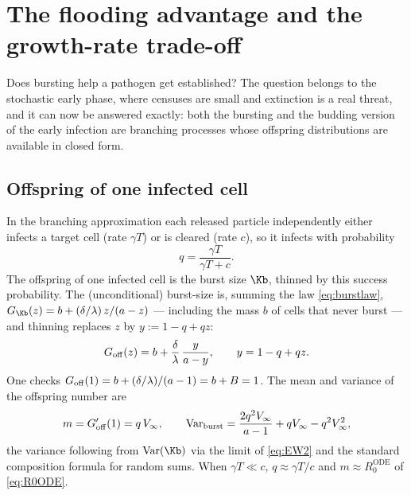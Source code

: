 
\section{The flooding advantage and the growth-rate trade-off}
\label{sec:flooding}

Does bursting help a pathogen get established? The question belongs to the
stochastic early phase, where censuses are small and extinction is a real
threat, and it can now be answered exactly: both the bursting and the
budding version of the early infection are branching processes whose
offspring distributions are available in closed form.

\subsection{Offspring of one infected cell}

In the branching approximation each released particle independently either
infects a target cell (rate $\gamma T$) or is cleared (rate $c$), so it
infects with probability
\begin{equation}
q=\frac{\gamma T}{\gamma T+c}.
\end{equation}
The offspring of one infected cell is the burst size $\Kb$, thinned by this
success probability. The (unconditional) burst-size \pgf{} is, summing the
law \eqref{eq:burstlaw},
$G_{\Kb}(z)=b+(\delta/\lambda)\,z/(a-z)$ --- including the mass $b$ of cells
that never burst --- and thinning replaces $z$ by $y:=1-q+qz$:
\begin{equation}
G_{\rm off}(z)=b+\frac{\delta}{\lambda}\,\frac{y}{a-y},
\qquad y=1-q+qz.
\label{eq:Goff}
\end{equation}
One checks $G_{\rm off}(1)=b+(\delta/\lambda)/(a-1)=b+B=1$. The mean and
variance of the offspring number are
\begin{equation}
m=G_{\rm off}'(1)=q\,V_\infty,
\qquad
\mathrm{Var}_{\rm burst}
=\frac{2q^2V_\infty}{a-1}+qV_\infty-q^2V_\infty^2,
\label{eq:offmoments}
\end{equation}
the variance following from $\mathrm{Var}(\Kb)$ via the limit of
\eqref{eq:EW2} and the standard composition formula for random sums. When
$\gamma T\ll c$, $q\approx\gamma T/c$ and $m\approx R_0^{\mathrm{ODE}}$ of
\eqref{eq:R0ODE}.

